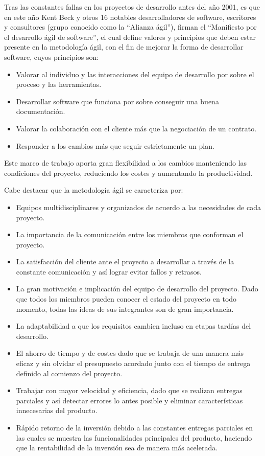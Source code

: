 Tras las constantes fallas en los proyectos de desarrollo antes del año 2001, es que en este año Kent Beck y otros 16 notables desarrolladores de software, escritores y consultores (grupo conocido como la ``Alianza ágil''), firman el ``Manifiesto por el desarrollo ágil de software'', el cual define valores y principios que deben estar presente en la metodología ágil, con el fin de mejorar la forma de desarrollar software, cuyos principios son:

\begin{itemize}
    \item Valorar al individuo y las interacciones del equipo de desarrollo por sobre el proceso y las herramientas.
    \item Desarrollar software que funciona por sobre conseguir una buena documentación.
    \item Valorar la colaboración con el cliente más que la negociación de un contrato.
    \item Responder a los cambios más que seguir estrictamente un plan.
\end{itemize}

Este marco de trabajo aporta gran flexibilidad a los cambios manteniendo las condiciones del proyecto, reduciendo los costes y aumentando la productividad.

Cabe destacar que la metodología ágil se caracteriza por:

\begin{itemize}
    \item Equipos multidisciplinares y organizados de acuerdo a las necesidades de cada proyecto.
    \item La importancia de la comunicación entre los miembros que conforman el proyecto.
    \item La satisfacción del cliente ante el proyecto a desarrollar a través de la constante comunicación y así lograr evitar fallos y retrasos.
    \item La gran motivación e implicación del equipo de desarrollo del proyecto. Dado que todos los miembros pueden conocer el estado del proyecto en todo momento, todas las ideas de sus integrantes son de gran importancia.
    \item La adaptabilidad a que los requisitos cambien incluso en etapas tardías del desarrollo.
    \item El ahorro de tiempo y de costes dado que se trabaja de una manera más eficaz y sin olvidar el presupuesto acordado junto con el tiempo de entrega definido al comienzo del proyecto.
    \item Trabajar con mayor velocidad y eficiencia, dado que se realizan entregas parciales y así detectar errores lo antes posible y eliminar características innecesarias del producto.
    \item Rápido retorno de la inversión debido a las constantes entregas parciales en las cuales se muestra las funcionalidades principales del producto, haciendo que la rentabilidad de la inversión sea de manera más acelerada.
\end{itemize}

